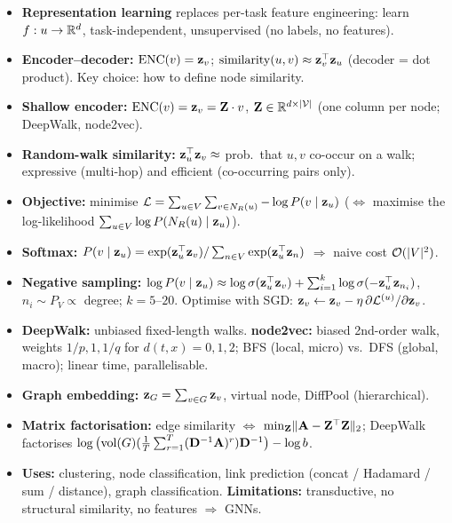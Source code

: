 \bigskip{}
{}
\begin{summarybox}
  \begin{itemize}
    \item \textbf{Representation learning} replaces per-task feature engineering:
      learn $f:u\to\mathbb{R}^d$, task-independent, unsupervised (no labels, no features).
    \item \textbf{Encoder--decoder:} $\operatorname{ENC}(v)=\mathbf{z}_v$;
      $\operatorname{similarity}(u,v)\approx\mathbf{z}_v^{\top}\mathbf{z}_u$ (decoder = dot product). Key choice:
      how to define node similarity.
    \item \textbf{Shallow encoder:} $\operatorname{ENC}(v)=\mathbf{z}_v=\mathbf{Z}\cdot v$,
      $\mathbf{Z}\in\mathbb{R}^{d\times|\mathcal{V}|}$ (one column per node; DeepWalk, node2vec).
    \item \textbf{Random-walk similarity:} $\mathbf{z}_u^{\top}\mathbf{z}_v\approx$ prob.\ that $u,v$
      co-occur on a walk; expressive (multi-hop) and efficient (co-occurring pairs only).
    \item \textbf{Objective:} minimise
      $\mathcal{L}=\sum_{u\in V}\sum_{v\in N_R(u)}-\log P(v\mid\mathbf{z}_u)$
      ($\Leftrightarrow$ maximise the log-likelihood
      $\sum_{u\in V}\log P(N_R(u)\mid\mathbf{z}_u)$).
    \item \textbf{Softmax:}
      $P(v\mid\mathbf{z}_u)=\exp(\mathbf{z}_u^{\top}\mathbf{z}_v)/\sum_{n\in V}\exp(\mathbf{z}_u^{\top}\mathbf{z}_n)$
      $\Rightarrow$ naive cost $\mathcal{O}(|V|^2)$.
    \item \textbf{Negative sampling:} $\log P(v\mid\mathbf{z}_u)\approx\log\sigma(\mathbf{z}_u^{\top}\mathbf{z}_v)
      +\sum_{i=1}^k\log\sigma(-\mathbf{z}_u^{\top}\mathbf{z}_{n_i})$, $n_i\sim P_V\propto$ degree;
      $k=5$--$20$. Optimise with SGD:
      $\mathbf{z}_v\leftarrow\mathbf{z}_v-\eta\,\partial\mathcal{L}^{(u)}/\partial\mathbf{z}_v$.
    \item \textbf{DeepWalk:} unbiased fixed-length walks. \textbf{node2vec:} biased
      2nd-order walk, weights $1/p,1,1/q$ for $d(t,x)=0,1,2$; BFS (local, micro)
      vs.\ DFS (global, macro); linear time, parallelisable.
    \item \textbf{Graph embedding:} $\mathbf{z}_G=\sum_{v\in G}\mathbf{z}_v$, virtual node,
      DiffPool (hierarchical).
    \item \textbf{Matrix factorisation:} edge similarity $\Leftrightarrow$
      $\min_{\mathbf{Z}}\lVert\mathbf{A}-\mathbf{Z}^{\top}\mathbf{Z}\rVert_2$; DeepWalk factorises
      $\log\big(\mathrm{vol}(G)(\frac1T\sum_{r=1}^T(\mathbf{D}^{-1}\mathbf{A})^r)\mathbf{D}^{-1}\big)-\log b$.
    \item \textbf{Uses:} clustering, node classification, link prediction
      (concat / Hadamard / sum / distance), graph classification.
      \textbf{Limitations:} transductive, no structural similarity, no features
      $\Rightarrow$ GNNs.
  \end{itemize}
\end{summarybox}
